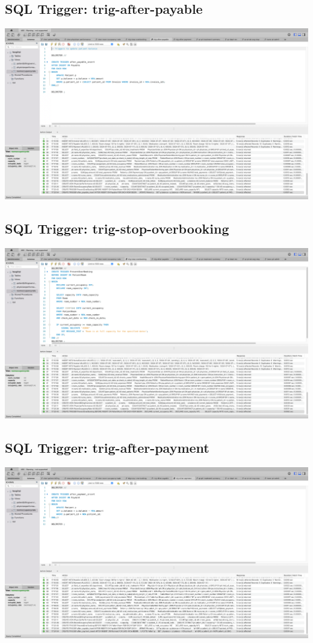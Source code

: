 \documentclass[a4paper,11pt]{article}
\theoremstyle{mytheor}
\begin{document}
\subsection{SQL Trigger: trig-after-payable}
\includegraphics[width=\textwidth]{Screenshots/SCR-20240727-pgrc.png}

\subsection{SQL Trigger: trig-stop-overbooking}
\includegraphics[width=\textwidth]{Screenshots/SCR-20240727-pgpr.png}

\subsection{SQL Trigger: trig-after-payment}
\includegraphics[width=\textwidth]{Screenshots/SCR-20240727-pgsq.png}
\end{document}
